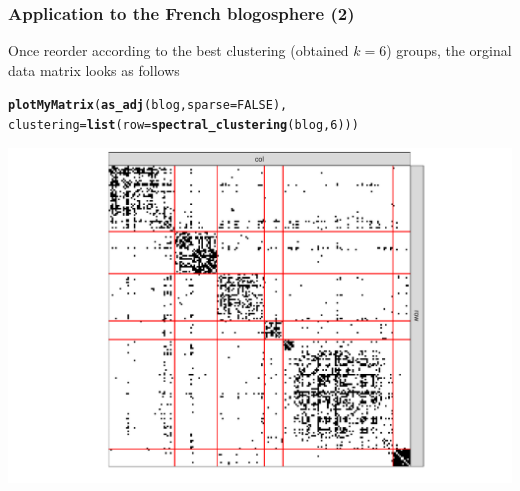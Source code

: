 \documentclass{beamer}\usepackage[]{graphicx}\usepackage[]{color}
\makeatletter
\newcommand{\hlnum}[1]{\textcolor[rgb]{0.686,0.059,0.569}{#1}}%
\newcommand{\hlstd}[1]{\textcolor[rgb]{0.345,0.345,0.345}{#1}}%
\newcommand{\hlkwc}[1]{\textcolor[rgb]{0.333,0.667,0.333}{#1}}%
\newcommand{\hlkwd}[1]{\textcolor[rgb]{0.737,0.353,0.396}{\textbf{#1}}}%
\newenvironment{kframe}{%
 \def\at@end@of@kframe{}%
 \ifinner\ifhmode%
  \def\at@end@of@kframe{\end{minipage}}%
  \begin{minipage}{\columnwidth}%
 \fi\fi%
 \def\FrameCommand##1{\hskip\@totalleftmargin \hskip-\fboxsep
 \colorbox{shadecolor}{##1}\hskip-\fboxsep
     \hskip-\linewidth \hskip-\@totalleftmargin \hskip\columnwidth}%
 \MakeFramed {\advance\hsize-\width
   \@totalleftmargin\z@ \linewidth\hsize
   \@setminipage}}%
 {\par\unskip\endMakeFramed%
 \at@end@of@kframe}
\newenvironment{knitrout}{}{} %
\makeatother
\begin{document}
\begin{frame}[fragile]
  \frametitle{Application to the French blogosphere (2)}

Once reorder according to the best clustering (obtained $k=6$) groups, the orginal data matrix looks as follows

\begin{knitrout}\scriptsize
{}\color{fgcolor}\begin{kframe}
\begin{alltt}
\hlkwd{plotMyMatrix}\hlstd{(}\hlkwd{as_adj}\hlstd{(blog,} \hlkwc{sparse} \hlstd{=} \hlnum{FALSE}\hlstd{),}
  \hlkwc{clustering} \hlstd{=} \hlkwd{list}\hlstd{(}\hlkwc{row} \hlstd{=} \hlkwd{spectral_clustering}\hlstd{(blog,} \hlnum{6}\hlstd{)))}
\end{alltt}
\end{kframe}
\includegraphics[width=.8\textwidth]{figures/unnamed-chunk-7-1} 
\end{knitrout}

\end{frame}

% 
% 
% 
% 
% 
% 
\end{document}
